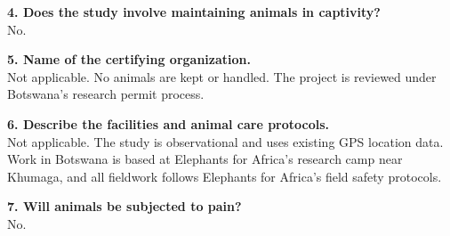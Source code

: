 \documentclass[11pt,a4paper]{article}
\begin{document}
\textbf{4. Does the study involve maintaining animals in captivity?}\\
No.

\textbf{5. Name of the certifying organization.}\\
Not applicable. No animals are kept or handled. The project is reviewed under Botswana's research permit process.

\textbf{6. Describe the facilities and animal care protocols.}\\
Not applicable. The study is observational and uses existing GPS location data. Work in Botswana is based at Elephants for Africa's research camp near Khumaga, and all fieldwork follows Elephants for Africa's field safety protocols.

\textbf{7. Will animals be subjected to pain?}\\
No.
\end{document}
